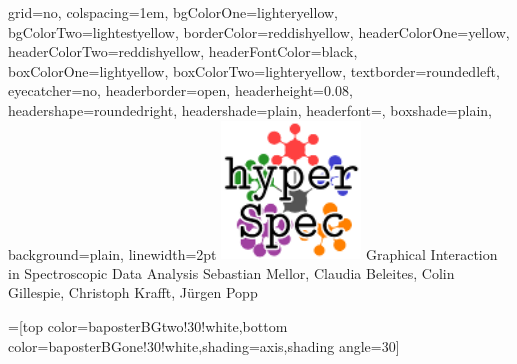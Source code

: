 \documentclass[portrait,final,a0paper]{baposter}
\begin{document}
\newlength{\leftimgwidth}
\begin{poster}%
  {
  grid=no,
  colspacing=1em,
  bgColorOne=lighteryellow,
  bgColorTwo=lightestyellow,
  borderColor=reddishyellow,
  headerColorOne=yellow,
  headerColorTwo=reddishyellow,
  headerFontColor=black,
  boxColorOne=lightyellow,
  boxColorTwo=lighteryellow,
  textborder=roundedleft,
  eyecatcher=no,
  headerborder=open,
  headerheight=0.08\textheight,
  headershape=roundedright,
  headershade=plain,
  headerfont=\Large\textsf, %
  boxshade=plain,
  background=plain,
  linewidth=2pt
  }
  {\includegraphics[width=10em]{hylogo}} %
  {\sf %
  \vspace{0.5em}
Graphical Interaction in Spectroscopic Data Analysis
  \vspace{0.5em}}
  {\sf %
  \vspace{1em}
  Sebastian Mellor, Claudia Beleites, Colin Gillespie, Christoph Krafft, J\"{u}rgen Popp
  }
  {%
  }

  =[top color=baposterBGtwo!30!white,bottom color=baposterBGone!30!white,shading=axis,shading angle=30]


\end{poster}
\end{document}
